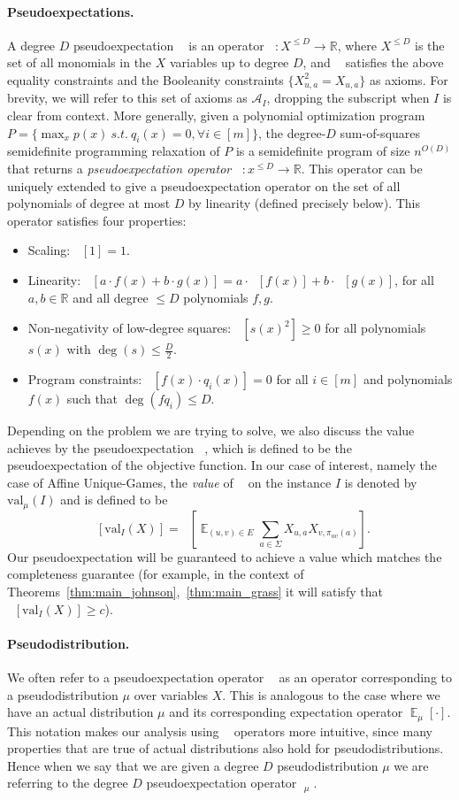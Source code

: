 \documentclass[11pt]{article}
\DeclareMathOperator*{\E}{\mathbb{E}}
\DeclareMathOperator*{\pE}{\widetilde{\mathbb{E}}}
\def \R {\mathbb{R}}
\def \A {\mathcal{A}}
\def \val {\mathrm{val}}
\theoremstyle{definition}
\begin{document}
\paragraph{Pseudoexpectations.}
A degree $D$ pseudoexpectation $\pE$ is an operator $\pE:X^{\le D} \to \R$, where $X^{\le D}$ is the set of all monomials in the $X$ variables up to degree $D$, and $\pE$ satisfies the above equality constraints and the Booleanity constraints $\{X_{u,a}^2 = X_{u,a}\}$ as axioms.  For brevity, we will refer to this set of axioms as $\A_{I}$, dropping the subscript when $I$ is clear from context. More generally, given a polynomial optimization program $P = \{\max_{x} p(x) \ s.t. ~ q_i(x) = 0, \forall i \in [m] \}$, the degree-$D$ sum-of-squares semidefinite programming relaxation of $P$ is a semidefinite program of size $n^{O(D)}$ that returns a {\em pseudoexpectation operator} $\pE: x^{\le D} \to \R$. This operator can be uniquely extended to give a pseudoexpectation operator on the set of all polynomials of degree at most $D$ by linearity (defined precisely below).
This operator satisfies four properties:
\begin{itemize}
\item Scaling: $\pE[1] = 1$.
\item Linearity: $\pE[a \cdot f(x) + b \cdot g(x)] = a\cdot \pE[f(x)] + b \cdot \pE[g(x)]$, for all $a,b \in \R$ and all degree $\leq D$ polynomials $f,g$. 
\item Non-negativity of low-degree squares: $\pE[s(x)^2] \ge 0$ for all polynomials $s(x)$ with $\deg(s) \le \tfrac{D}{2}$.
\item Program constraints: $\pE[f(x) \cdot q_i(x)] = 0$ for all $i \in [m]$ and polynomials $f(x)$ such that $\deg(fq_i) \le D$.
\end{itemize}
Depending on the problem we are trying to solve, we also 
discuss the value achieves by the pseudoexpectation $\pE$, 
which is defined to be the pseudoexpectation of the objective 
function. In our case of interest, namely the case of Affine 
Unique-Games, the \emph{value} of $\pE$ on the instance $I$ is denoted by $\val_\mu(I)$ and is defined to be 
\[
\pE[\val_{I}(X)] = \pE \left[ \E_{(u,v) \in E} \sum_{a \in \Sigma} X_{u,a} X_{v,\pi_{uv}(a)}\right].
\]
Our pseudoexpectation will be guaranteed to achieve a value which matches the completeness guarantee (for example, in 
the context of Theorems~\ref{thm:main_johnson},~\ref{thm:main_grass} it will satisfy that $\pE[\val_{I}(X)]\geq c$).

\paragraph{Pseudodistribution.} 
We often refer to a pseudoexpectation operator $\pE$ as an operator corresponding to a pseudodistribution $\mu$ over variables $X$. This is analogous to the case where we have an actual distribution $\mu$ and its corresponding expectation operator $\E_\mu[\cdot]$. This notation makes our analysis using $\pE$ operators more intuitive, since many properties that are true of actual distributions also hold for pseudodistributions. Hence when we say that we are given a degree $D$ pseudodistribution $\mu$ we are referring to the degree $D$ pseudoexpectation operator $\pE_\mu$.
\end{document}

